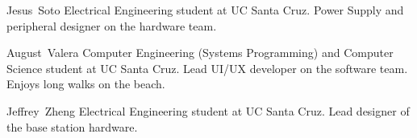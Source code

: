 \documentclass[journal,compsoc]{IEEEtran}
\begin{document}
\begin{IEEEbiography}
{Jesus~Soto}
  Electrical Engineering student at UC Santa Cruz. Power Supply and peripheral designer on the hardware team. 
\end{IEEEbiography}

\begin{IEEEbiography}
{August~Valera}
  Computer Engineering (Systems Programming) and Computer Science student at UC Santa Cruz. Lead UI/UX developer on the software team. Enjoys long walks on the beach.
\end{IEEEbiography}

\begin{IEEEbiography}
{Jeffrey~Zheng}
  Electrical Engineering student at UC Santa Cruz. Lead designer of the base station hardware.
\end{IEEEbiography}





\end{document}
